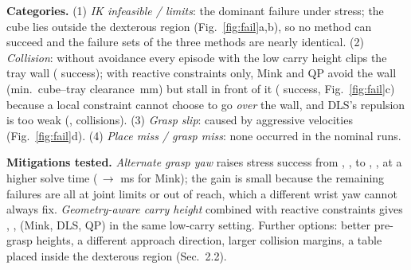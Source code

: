 \documentclass[10pt,a4paper]{article}
\begin{document}
\textbf{Categories.} (1) \emph{IK infeasible / limits}: the dominant failure under stress; the cube lies outside the dexterous region (Fig.~\ref{fig:fail}a,b), so no method can succeed and the failure sets of the three methods are nearly identical.
(2) \emph{Collision}: without avoidance every episode with the low carry height clips the tray wall (\lcNoCASuccMink{} success); with reactive constraints only, Mink and QP avoid the wall (min.\ cube--tray clearance \lcCAClrCQP{}\,mm) but
stall in front of it (\lcCASuccQP{} success, Fig.~\ref{fig:fail}c) because a local constraint cannot choose to go \emph{over} the wall, and DLS's repulsion is too weak (\lcCASuccDLS{}, collisions).
(3) \emph{Grasp slip}: caused by aggressive velocities (Fig.~\ref{fig:fail}d). (4) \emph{Place miss / grasp miss}: none occurred in the nominal runs.

\textbf{Mitigations tested.} \emph{Alternate grasp yaw} raises stress success from \stressSuccMink{}, \stressSuccDLS{}, \stressSuccQP{} to \retrySuccMink{}, \retrySuccDLS{}, \retrySuccQP{} at a higher solve time (\stressMsMink{}\,$\to$\,\retryMsMink{}\,ms for Mink); the gain is small because the remaining failures are all at joint limits or out of reach, which a different wrist yaw cannot always fix.
\emph{Geometry-aware carry height} combined with reactive constraints gives \lcSmartSuccMink{}, \lcSmartSuccDLS{}, \lcSmartSuccQP{} (Mink, DLS, QP) in the same low-carry setting. Further options: better pre-grasp heights,
a different approach direction, larger collision margins, a table placed inside the dexterous region (Sec.~2.2).
\end{document}
